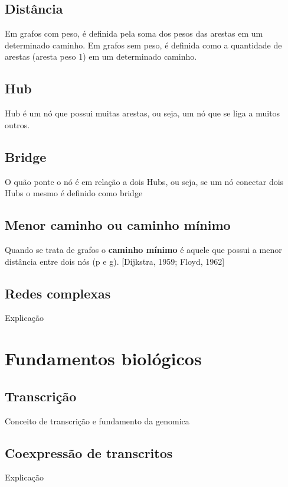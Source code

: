 
\subsection{Distância}
Em grafos com peso, é definida pela soma dos pesos das arestas em um determinado caminho.
Em grafos sem peso, é definida como a quantidade de arestas (aresta peso 1) em um determinado caminho.



\subsection{Hub}
Hub é um nó que possui muitas arestas, ou seja, um nó que se liga a muitos outros.


\subsection{Bridge}
O quão ponte o nó é em relação a dois Hubs, ou seja, se um nó conectar dois Hubs o mesmo é definido como bridge


\subsection{Menor caminho ou caminho mínimo}
Quando se trata de grafos o \textbf{caminho mínimo} é aquele que possui a menor distância entre dois nós (p e g). \cite{dikstra-floyd} [Dijkstra, 1959; Floyd, 1962]

\subsection{Redes complexas}
Explicação



\section{Fundamentos biológicos}

\subsection{Transcrição}
Conceito de transcrição e fundamento da genomica


\subsection{Coexpressão de transcritos}
Explicação

